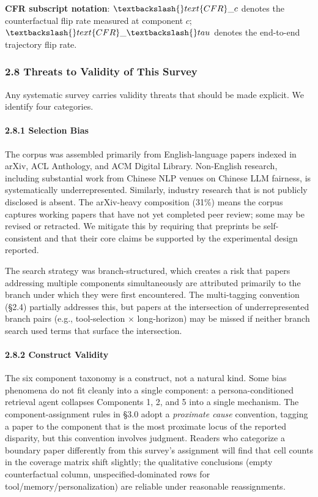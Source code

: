\documentclass[10pt]{article}
\begin{document}
\textbf{CFR subscript notation}: $\textbackslash\{\}text\{CFR\}\_c$ denotes the counterfactual flip rate measured at component $c$; $\textbackslash\{\}text\{CFR\}\_\textbackslash\{\}tau$ denotes the end-to-end trajectory flip rate.


\subsubsection*{2.8 Threats to Validity of This Survey}

Any systematic survey carries validity threats that should be made explicit. We identify four categories.

\paragraph*{2.8.1 Selection Bias}

The corpus was assembled primarily from English-language papers indexed in arXiv, ACL Anthology, and ACM Digital Library. Non-English research, including substantial work from Chinese NLP venues on Chinese LLM fairness, is systematically underrepresented. Similarly, industry research that is not publicly disclosed is absent. The arXiv-heavy composition (31\%) means the corpus captures working papers that have not yet completed peer review; some may be revised or retracted. We mitigate this by requiring that preprints be self-consistent and that their core claims be supported by the experimental design reported.

The search strategy was branch-structured, which creates a risk that papers addressing multiple components simultaneously are attributed primarily to the branch under which they were first encountered. The multi-tagging convention (\S{}2.4) partially addresses this, but papers at the intersection of underrepresented branch pairs (e.g., tool-selection $\times$ long-horizon) may be missed if neither branch search used terms that surface the intersection.

\paragraph*{2.8.2 Construct Validity}

The six component taxonomy is a construct, not a natural kind. Some bias phenomena do not fit cleanly into a single component: a persona-conditioned retrieval agent collapses Components 1, 2, and 5 into a single mechanism. The component-assignment rules in \S{}3.0 adopt a \emph{proximate cause} convention, tagging a paper to the component that is the most proximate locus of the reported disparity, but this convention involves judgment. Readers who categorize a boundary paper differently from this survey's assignment will find that cell counts in the coverage matrix shift slightly; the qualitative conclusions (empty counterfactual column, unspecified-dominated rows for tool/memory/personalization) are reliable under reasonable reassignments.
\end{document}
